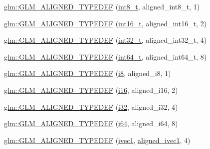 \begin{DoxyCompactItemize}
\item 
\hyperlink{group__gtx__type__aligned_ga848aedf13e2d9738acf0bb482c590174}{glm\+::\+G\+L\+M\+\_\+\+A\+L\+I\+G\+N\+E\+D\+\_\+\+T\+Y\+P\+E\+D\+EF} (\hyperlink{group__gtc__type__precision_ga673898d450b2a91186f3c4f40c5f8633}{int8\+\_\+t}, aligned\+\_\+int8\+\_\+t, 1)
\item 
\hyperlink{group__gtx__type__aligned_gafd2803d39049dd45a37a63931e25d943}{glm\+::\+G\+L\+M\+\_\+\+A\+L\+I\+G\+N\+E\+D\+\_\+\+T\+Y\+P\+E\+D\+EF} (\hyperlink{group__gtc__type__precision_gaf89ee61e0d34aa4a462104b7ae7f2da6}{int16\+\_\+t}, aligned\+\_\+int16\+\_\+t, 2)
\item 
\hyperlink{group__gtx__type__aligned_gae553b33349d6da832cf0724f1e024094}{glm\+::\+G\+L\+M\+\_\+\+A\+L\+I\+G\+N\+E\+D\+\_\+\+T\+Y\+P\+E\+D\+EF} (\hyperlink{group__gtc__type__precision_gab870c0eb6f525b0c8c4716762e0fc3a8}{int32\+\_\+t}, aligned\+\_\+int32\+\_\+t, 4)
\item 
\hyperlink{group__gtx__type__aligned_ga16d223a2b3409e812e1d3bd87f0e9e5c}{glm\+::\+G\+L\+M\+\_\+\+A\+L\+I\+G\+N\+E\+D\+\_\+\+T\+Y\+P\+E\+D\+EF} (\hyperlink{group__gtc__type__precision_ga6abb23fbf4e39c50ec5341160b5da5ab}{int64\+\_\+t}, aligned\+\_\+int64\+\_\+t, 8)
\item 
\hyperlink{group__gtx__type__aligned_ga2de065d2ddfdb366bcd0febca79ae2ad}{glm\+::\+G\+L\+M\+\_\+\+A\+L\+I\+G\+N\+E\+D\+\_\+\+T\+Y\+P\+E\+D\+EF} (\hyperlink{group__gtc__type__precision_gaae064be68b7d36cd7910c16e8ad18bba}{i8}, aligned\+\_\+i8, 1)
\item 
\hyperlink{group__gtx__type__aligned_gabd786bdc20a11c8cb05c92c8212e28d3}{glm\+::\+G\+L\+M\+\_\+\+A\+L\+I\+G\+N\+E\+D\+\_\+\+T\+Y\+P\+E\+D\+EF} (\hyperlink{group__gtc__type__precision_ga35e5542ca05b29cc256fdafb8503d1fd}{i16}, aligned\+\_\+i16, 2)
\item 
\hyperlink{group__gtx__type__aligned_gad4aefe56691cdb640c72f0d46d3fb532}{glm\+::\+G\+L\+M\+\_\+\+A\+L\+I\+G\+N\+E\+D\+\_\+\+T\+Y\+P\+E\+D\+EF} (\hyperlink{group__gtc__type__precision_ga1d8ed5c43e91ea7d4528389da4fa9524}{i32}, aligned\+\_\+i32, 4)
\item 
\hyperlink{group__gtx__type__aligned_ga8fe9745f7de24a8394518152ff9fccdc}{glm\+::\+G\+L\+M\+\_\+\+A\+L\+I\+G\+N\+E\+D\+\_\+\+T\+Y\+P\+E\+D\+EF} (\hyperlink{group__gtc__type__precision_gac7a7eaad46064fc952b06df33689da23}{i64}, aligned\+\_\+i64, 8)
\item 
\hyperlink{group__gtx__type__aligned_gaaad735483450099f7f882d4e3a3569bd}{glm\+::\+G\+L\+M\+\_\+\+A\+L\+I\+G\+N\+E\+D\+\_\+\+T\+Y\+P\+E\+D\+EF} (\hyperlink{group__ext__vec1_ga946031cea0c22745848ebd873e6facb0}{ivec1}, \hyperlink{group__gtc__type__aligned_gafe9657c41fa58e912f99e92284d79fce}{aligned\+\_\+ivec1}, 4)

\end{DoxyCompactItemize}
